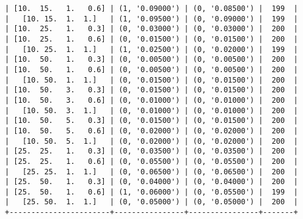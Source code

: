 \documentclass{article}
\begin{document}
\begin{verbatim}
| [10.  15.   1.   0.6] | (1, '0.09000') | (0, '0.08500') |  199  |
|   [10. 15.  1.  1.]   | (1, '0.09500') | (0, '0.09000') |  199  |
| [10.  25.   1.   0.3] | (0, '0.03000') | (0, '0.03000') |  200  |
| [10.  25.   1.   0.6] | (0, '0.01500') | (0, '0.01500') |  200  |
|   [10. 25.  1.  1.]   | (1, '0.02500') | (0, '0.02000') |  199  |
| [10.  50.   1.   0.3] | (0, '0.00500') | (0, '0.00500') |  200  |
| [10.  50.   1.   0.6] | (0, '0.00500') | (0, '0.00500') |  200  |
|   [10. 50.  1.  1.]   | (0, '0.01500') | (0, '0.01500') |  200  |
| [10.  50.   3.   0.3] | (0, '0.01500') | (0, '0.01500') |  200  |
| [10.  50.   3.   0.6] | (0, '0.01000') | (0, '0.01000') |  200  |
|   [10. 50.  3.  1.]   | (0, '0.01000') | (0, '0.01000') |  200  |
| [10.  50.   5.   0.3] | (0, '0.01500') | (0, '0.01500') |  200  |
| [10.  50.   5.   0.6] | (0, '0.02000') | (0, '0.02000') |  200  |
|   [10. 50.  5.  1.]   | (0, '0.02000') | (0, '0.02000') |  200  |
| [25.  25.   1.   0.3] | (0, '0.03500') | (0, '0.03500') |  200  |
| [25.  25.   1.   0.6] | (0, '0.05500') | (0, '0.05500') |  200  |
|   [25. 25.  1.  1.]   | (0, '0.06500') | (0, '0.06500') |  200  |
| [25.  50.   1.   0.3] | (0, '0.04000') | (0, '0.04000') |  200  |
| [25.  50.   1.   0.6] | (1, '0.06000') | (0, '0.05500') |  199  |
|   [25. 50.  1.  1.]   | (0, '0.05000') | (0, '0.05000') |  200  |
+-----------------------+----------------+----------------+-------+
\end{verbatim}
\end{document}
